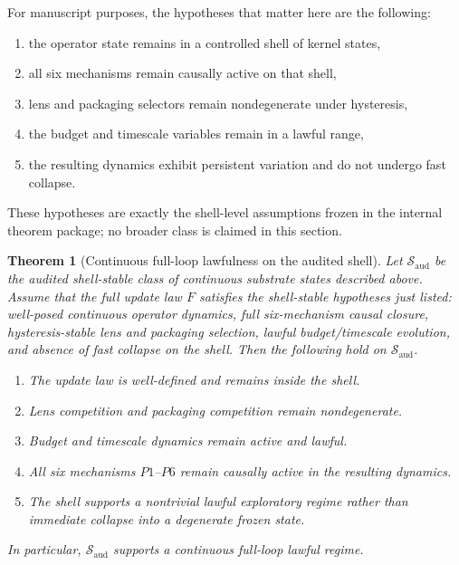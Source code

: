 \documentclass[11pt]{article}
\newtheorem{theorem}{Theorem}[section]
\theoremstyle{definition}
\begin{document}
For manuscript purposes, the hypotheses that matter here are the following:
\begin{enumerate}
    \item the operator state remains in a controlled shell of kernel states,
    \item all six mechanisms remain causally active on that shell,
    \item lens and packaging selectors remain nondegenerate under hysteresis,
    \item the budget and timescale variables remain in a lawful range,
    \item the resulting dynamics exhibit persistent variation and do not undergo fast collapse.
\end{enumerate}
These hypotheses are exactly the shell-level assumptions frozen in the internal theorem package; no broader class is claimed in this section.

\begin{theorem}[Continuous full-loop lawfulness on the audited shell]\label{thm:lawfulness}
Let \(\mathcal{S}_{\mathrm{aud}}\) be the audited shell-stable class of continuous substrate states described above. Assume that the full update law \(F\) satisfies the shell-stable hypotheses just listed: well-posed continuous operator dynamics, full six-mechanism causal closure, hysteresis-stable lens and packaging selection, lawful budget/timescale evolution, and absence of fast collapse on the shell. Then the following hold on \(\mathcal{S}_{\mathrm{aud}}\).

\begin{enumerate}
    \item The update law is well-defined and remains inside the shell.
    \item Lens competition and packaging competition remain nondegenerate.
    \item Budget and timescale dynamics remain active and lawful.
    \item All six mechanisms \(P1\)--\(P6\) remain causally active in the resulting dynamics.
    \item The shell supports a nontrivial lawful exploratory regime rather than immediate collapse into a degenerate frozen state.
\end{enumerate}

In particular, \(\mathcal{S}_{\mathrm{aud}}\) supports a continuous full-loop lawful regime.
\end{theorem}
\end{document}
